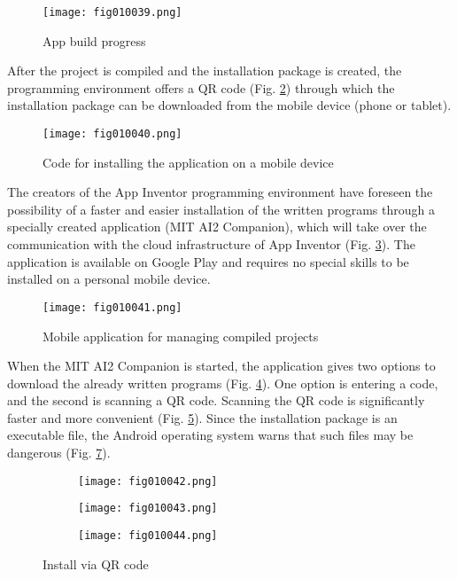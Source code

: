 \begin{figure}[H]
   \centering
   \texttt{[image: fig010039.png]}
   \caption{App build progress}
\label{fig010039}
\end{figure}

After the project is compiled and the installation package is created, the programming environment offers a QR code (Fig. \ref{fig010040}) through which the installation package can be downloaded from the mobile device (phone or tablet).

\begin{figure}[H]
   \centering
   \texttt{[image: fig010040.png]}
   \caption{Code for installing the application on a mobile device}
\label{fig010040}
\end{figure}

The creators of the App Inventor programming environment have foreseen the possibility of a faster and easier installation of the written programs through a specially created application (MIT AI2 Companion), which will take over the communication with the cloud infrastructure of App Inventor (Fig. \ref{fig010041}). The application is available on Google Play and requires no special skills to be installed on a personal mobile device.

\begin{figure}[H]
   \centering
   \texttt{[image: fig010041.png]}
   \caption{Mobile application for managing compiled projects}
\label{fig010041}
\end{figure}

When the MIT AI2 Companion is started, the application gives two options to download the already written programs (Fig. \ref{fig010042}). One option is entering a code, and the second is scanning a QR code. Scanning the QR code is significantly faster and more convenient (Fig. \ref{fig010043}). Since the installation package is an executable file, the Android operating system warns that such files may be dangerous (Fig. \ref{fig010044}).

\begin{figure}[H]
   \begin{subfigure}{0.31\textwidth}
   \texttt{[image: fig010042.png]}
   \label{fig010042}
   \end{subfigure}
   \begin{subfigure}{0.31\textwidth}
   \texttt{[image: fig010043.png]}
   \label{fig010043}
   \end{subfigure}
   \begin{subfigure}{0.31\textwidth}
   \texttt{[image: fig010044.png]}
   \label{fig010044}
   \end{subfigure}
   \caption{Install via QR code}
\end{figure}

